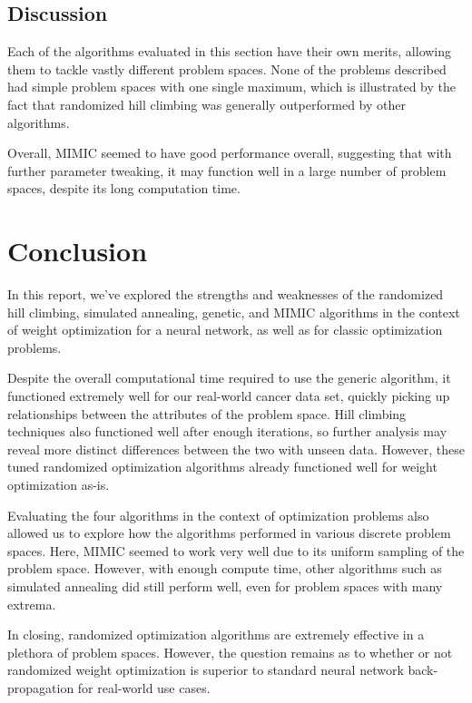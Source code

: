 \documentclass{article}
\begin{document}
    \subsection{Discussion}
      Each of the algorithms evaluated in this section have their own merits, allowing them to tackle vastly different problem spaces. None of the problems described had simple problem spaces with one single maximum, which is illustrated by the fact that randomized hill climbing was generally outperformed by other algorithms.

      Overall, MIMIC seemed to have good performance overall, suggesting that with further parameter tweaking, it may function well in a large number of problem spaces, despite its long computation time.

  \section{Conclusion}
    In this report, we've explored the strengths and weaknesses of the randomized hill climbing, simulated annealing, genetic, and MIMIC algorithms in the context of weight optimization for a neural network, as well as for classic optimization problems.

    Despite the overall computational time required to use the generic algorithm, it functioned extremely well for our real-world cancer data set, quickly picking up relationships between the attributes of the problem space. Hill climbing techniques also functioned well after enough iterations, so further analysis may reveal more distinct differences between the two with unseen data. However, these tuned randomized optimization algorithms already functioned well for weight optimization as-is.

    Evaluating the four algorithms in the context of optimization problems also allowed us to explore how the algorithms performed in various discrete problem spaces. Here, MIMIC seemed to work very well due to its uniform sampling of the problem space. However, with enough compute time, other algorithms such as simulated annealing did still perform well, even for problem spaces with many extrema.

    In closing, randomized optimization algorithms are extremely effective in a plethora of problem spaces. However, the question remains as to whether or not randomized weight optimization is superior to standard neural network back-propagation for real-world use cases. 
\end{document}
